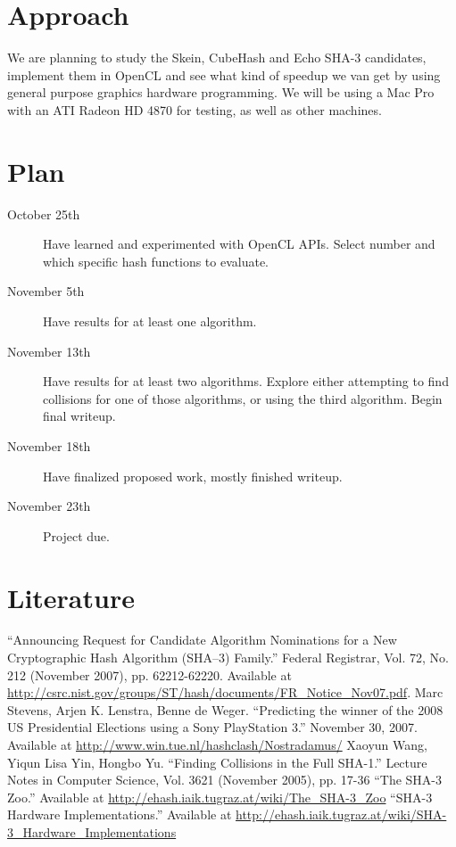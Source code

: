 \documentclass{article}
\begin{document}
\section{Approach}

We are planning to study the Skein, CubeHash and Echo SHA-3 candidates, implement them in OpenCL and see what kind of speedup we van get by using general purpose graphics hardware programming. We will be using a Mac Pro with an ATI Radeon HD 4870 for testing, as well as other machines.

\section{Plan}
\begin{description}
  \item[October 25th] Have learned and experimented with OpenCL APIs. Select number and which specific hash functions to evaluate.
  \item[November 5th] Have results for at least one algorithm.
  \item[November 13th] Have results for at least two algorithms. Explore either attempting to find collisions for one of those algorithms, or using the third algorithm.  Begin final writeup.
  \item[November 18th] Have finalized proposed work, mostly finished writeup.
  \item[November 23th] Project due.
\end{description}

\section{Literature}

\begin{thebibliography}{9}
   ``Announcing Request for Candidate Algorithm Nominations for a New Cryptographic Hash Algorithm (SHA–3) Family.'' Federal Registrar, Vol. 72, No. 212 (November 2007), pp. 62212-62220. Available at \url{http://csrc.nist.gov/groups/ST/hash/documents/FR_Notice_Nov07.pdf}.
   Marc Stevens, Arjen K. Lenstra, Benne de Weger. ``Predicting the winner of the 2008 US Presidential Elections using a Sony PlayStation 3.'' November 30, 2007. Available at \url{http://www.win.tue.nl/hashclash/Nostradamus/}
   Xaoyun Wang, Yiqun Lisa Yin, Hongbo Yu. ``Finding Collisions in the Full SHA-1.'' Lecture Notes in Computer Science, Vol. 3621 (November 2005), pp. 17-36
   ``The SHA-3 Zoo.'' Available at \url{http://ehash.iaik.tugraz.at/wiki/The_SHA-3_Zoo}
   ``SHA-3 Hardware Implementations.'' Available at \url{http://ehash.iaik.tugraz.at/wiki/SHA-3_Hardware_Implementations}
\end{thebibliography}
\end{document}
